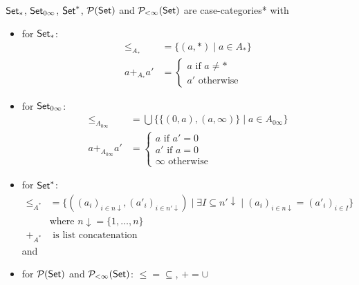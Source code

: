 \documentclass[runningheads,envcountsame]{llncs}
\begin{document}
\begin{lemma}
    $\mathsf{Set}_*$, $\mathsf{Set}_{0\infty}$, $\mathsf{Set}^*$, $\mathcal{P}(\mathsf{Set})$ and $\mathcal{P}_{<\infty}(\mathsf{Set})$ are case-categories* with
    \begin{itemize}
        \item for $\mathsf{Set}_*$: \begin{align}
            \leq_{A_*} &= \{(a, *) \mid a \in A_*\} \\
            a +_{A_*} a' &= \begin{cases}
            a \text{ if } a \neq * \\
            a' \text{ otherwise}
            \end{cases}
        \end{align}
        \item for $\mathsf{Set}_{0\infty}$: \begin{align}
            \leq_{A_{0\infty}} &= \bigcup \{\{(0, a), (a, \infty)\} \mid a \in A_{0\infty}\} \\
            a +_{A_{0\infty}} a' &= \begin{cases}
            a \text{ if } a' = 0 \\
            a' \text{ if } a = 0 \\
            \infty \text{ otherwise}
            \end{cases}
        \end{align}
        \item for $\mathsf{Set}^*$: \begin{align}
            \leq_{A^*} &= \{ ((a_i)_{i \in n\downarrow}, (a'_i)_{i \in n' \downarrow}) \mid \exists I \subseteq {n'\downarrow} \mid (a_i)_{i \in n\downarrow} = (a'_i)_{i \in I} \} \\
                & \text{where } {n{\downarrow}} = \{1, \dots, n\} \\
            +_{A^*} & \text{ is list concatenation}
        \end{align} and 
        \item for $\mathcal{P}(\mathsf{Set})$ and $\mathcal{P}_{<\infty}(\mathsf{Set})$: ${\leq} = {\subseteq}$, ${+} = {\cup}$
    \end{itemize}
\end{lemma}
\end{document}
